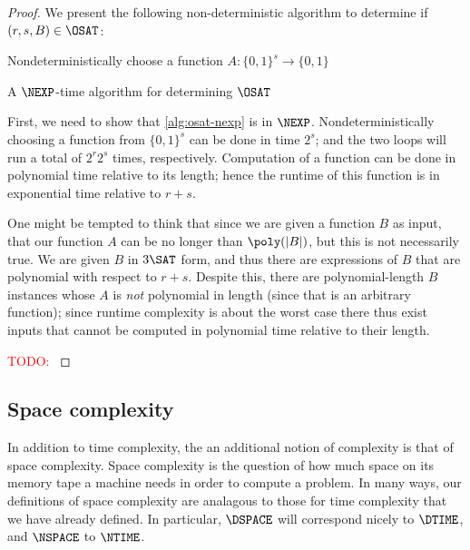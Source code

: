 \documentclass[english,12pt]{reedthesis}
\theoremstyle{plain}
\theoremstyle{definition}
\theoremstyle{remark}
\DeclarePairedDelimiter{\abs}{\lvert}{\rvert}
\newcommand{\TODO}[1]{\textcolor{red}{TODO: #1}}
\begin{document}
\begin{proof}
  We present the following non-deterministic algorithm to determine if
  $(r, s, B) \in \OSAT$:

  \begin{algorithm}[H]
    Nondeterministically choose a function $A\colon \{0, 1\}^{s} \rightarrow \{0, 1\}$\;
    \;
    \caption{A $\NEXP$-time algorithm for determining $\OSAT$}\label{alg:osat-nexp}
  \end{algorithm}

  First, we need to show that \cref{alg:osat-nexp} is in $\NEXP$.
  Nondeterministically choosing a function from $\{0, 1\}^{s}$ can be done in
  time $2^{s}$; and the two loops will run a total of $2^{r}2^{s}$ times,
  respectively. Computation of a function can be done in polynomial time
  relative to its length; hence the runtime of this function is in exponential
  time relative to $r + s$.

  One might be tempted to think that since we are given a function $B$ as input,
  that our function $A$ can be no longer than $\poly(\abs{B})$, but this is not
  necessarily true. We are given $B$ in $3\SAT$ form, and thus there are
  expressions of $B$ that are polynomial with respect to $r + s$. Despite this,
  there are polynomial-length $B$ instances whose $A$ is \emph{not} polynomial
  in length (since that is an arbitrary function); since runtime complexity is
  about the worst case there thus exist inputs that cannot be computed in
  polynomial time relative to their length.

  \TODO{}
\end{proof}

\subsection{Space complexity}

In addition to time complexity, the an additional notion of complexity is that
of space complexity. Space complexity is the question of how much space on its
memory tape a machine needs in order to compute a problem. In many ways, our
definitions of space complexity are analagous to those for time complexity that
we have already defined. In particular, $\DSPACE$ will correspond nicely to
$\DTIME$, and $\NSPACE$ to $\NTIME$.
\end{document}

